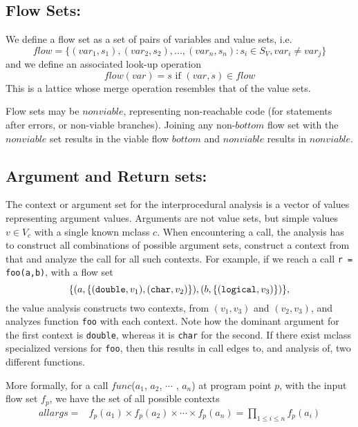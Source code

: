 \subsection{Flow Sets:} We define a flow set as a set of pairs of variables and value sets, i.e.
\begin{equation*}
flow = \{(var_1,s_1),(var_2,s_2),...,(var_n,s_n) : s_i \in S_V, var_i \neq var_j\}
\end{equation*}
and we define an associated look-up operation
\begin{equation*}
 flow(var) = s \text{ if } (var,s) \in flow
\end{equation*}
This is a lattice whose merge operation resembles that of the value sets.

Flow sets may be $nonviable$, representing non-reachable code (for
statements after errors, or non-viable branches). Joining any
non-$bottom$ flow set with the $nonviable$ set results in the viable
flow  $bottom$ and $nonviable$ results in $nonviable$.

\subsection{Argument and Return sets:}

The context or argument set for the interprocedural analysis is a
vector of values representing argument values. Arguments are not value
sets, but simple values $v \in V_c$ with a single known mclass $c$. When encountering
a call, the analysis has to construct all combinations of possible argument
sets, construct a context from that and analyze the call for all
such contexts. For example, if we reach a call
{\tt r = foo(a,b)}, with a flow set
\begin{equation*}
\{(a,\{(\text{{\tt double}},v_1),(\text{{\tt char}},v_2)\}),(b,\{(\text{{\tt logical}},v_3)\})\},
\end{equation*}
the value analysis constructs two contexts, from $(v_1,v_3)$ and $(v_2,v_3)$,
and analyzes function {\tt foo} with each context. Note how the
dominant argument for the first context is {\tt double}, whereas it is
{\tt char} for the second. If there exist mclass specialized versions
for {\tt foo}, then this results in call edges to, and analysis
of, two different functions.

More formally, for a call $     func$($a_1$, $a_2$, $\cdots$ ,
$a_n$) at program point $p$, with the input flow set $f_p$, we
have the set of all possible contexts
\begin{align*}
allargs =& f_p(a_1) \times f_p(a_2) \times \cdots \times f_p(a_n) =  \prod_{1 \leq i \leq n} {f_p(a_i)}
\end{align*}

